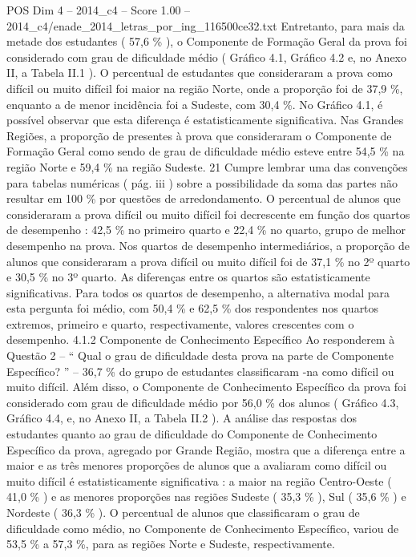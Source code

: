 \begin{textsample}{POS Dim 4 – 2014\_c4 – Score 1.00 – 2014\_c4/enade\_2014\_letras\_por\_ing\_116500ce32.txt}
Entretanto, para mais da metade dos estudantes ( 57,6 \% ), o Componente de Formação Geral da prova foi considerado com grau de dificuldade médio ( Gráfico 4.1, Gráfico 4.2 e, no Anexo II, a Tabela II.1 ).
O percentual de estudantes que consideraram a prova como difícil ou muito difícil foi maior na região Norte, onde a proporção foi de 37,9 \%, enquanto a de menor incidência foi a Sudeste, com 30,4 \%.
No Gráfico 4.1, é possível observar que esta diferença é estatisticamente significativa.
Nas Grandes Regiões, a proporção de presentes à prova que consideraram o Componente de Formação Geral como sendo de grau de dificuldade médio esteve entre 54,5 \% na região Norte e 59,4 \% na região Sudeste. 21 Cumpre lembrar uma das convenções para tabelas numéricas ( pág. iii ) sobre a possibilidade da soma das partes não resultar em 100 \% por questões de arredondamento.
O percentual de alunos que consideraram a prova difícil ou muito difícil foi decrescente em função dos quartos de desempenho : 42,5 \% no primeiro quarto e 22,4 \% no quarto, grupo de melhor desempenho na prova.
Nos quartos de desempenho intermediários, a proporção de alunos que consideraram a prova difícil ou muito difícil foi de 37,1 \% no 2º quarto e 30,5 \% no 3º quarto.
As diferenças entre os quartos são estatisticamente significativas.
Para todos os quartos de desempenho, a alternativa modal para esta pergunta foi médio, com 50,4 \% e 62,5 \% dos respondentes nos quartos extremos, primeiro e quarto, respectivamente, valores crescentes com o desempenho. 4.1.2 Componente de Conhecimento Específico Ao responderem à Questão 2 – “ Qual o grau de dificuldade desta prova na parte de Componente Específico? ” – 36,7 \% do grupo de estudantes classificaram -na como difícil ou muito difícil.
Além disso, o Componente de Conhecimento Específico da prova foi considerado com grau de dificuldade médio por 56,0 \% dos alunos ( Gráfico 4.3, Gráfico 4.4, e, no Anexo II, a Tabela II.2 ).
A análise das respostas dos estudantes quanto ao grau de dificuldade do Componente de Conhecimento Específico da prova, agregado por Grande Região, mostra que a diferença entre a maior e as três menores proporções de alunos que a avaliaram como difícil ou muito difícil é estatisticamente significativa : a maior na região Centro-Oeste ( 41,0 \% ) e as menores proporções nas regiões Sudeste ( 35,3 \% ), Sul ( 35,6 \% ) e Nordeste ( 36,3 \% ).
O percentual de alunos que classificaram o grau de dificuldade como médio, no Componente de Conhecimento Específico, variou de 53,5 \% a 57,3 \%, para as regiões Norte e Sudeste, respectivamente.

\end{textsample}
